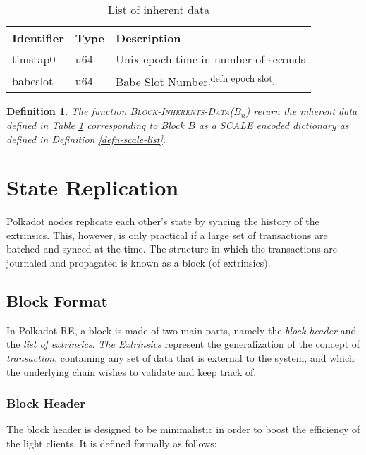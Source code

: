 \documentclass{book}
\newcommand{\tmem}[1]{{\em #1\/}}
\newcommand{\tmname}[1]{\textsc{#1}}
\newcommand{\tmrsup}[1]{\textsuperscript{#1}}
\newcommand{\tmtextit}[1]{{\itshape{#1}}}
\newcommand{\tmtextsc}[1]{{\scshape{#1}}}
\newtheorem{definition}{Definition}
\providecommand{\tmem}[1]{\tmtextit{#1}}
\providecommand{\tmname}[1]{\tmtextsc{#1}}
\providecommand{\tmtextit}[1]{\tmtextit{#1}}
\newtheorem{definition}{Definition}
\begin{document}
\begin{table}[h]
  \begin{tabular}{lll}
    \hline
    Identifier & Type  & Description\\
    \hline
    timstap0 & u64 & Unix epoch time in number of seconds\\
    babeslot & u64 & Babe Slot Number\tmrsup{\ref{defn-epoch-slot}}\\
    \hline
  \end{tabular}
  \caption{\label{tabl-inherent-data}List of inherent data}
\end{table}

\begin{definition}
  \label{defn-func-inherent-data}The function
  {\tmname{Block-Inherents-Data($B_n$)}} return the inherent data defined in
  Table \ref{tabl-inherent-data} corresponding to Block $B$ as a SCALE encoded
  dictionary as defined in Definition \ref{defn-scale-list}.
\end{definition}

\section{State Replication}\label{sect-state-replication}

Polkadot nodes replicate each other's state by syncing the history of the
extrinsics. This, however, is only practical if a large set of transactions
are batched and synced at the time. The structure in which the transactions
are journaled and propagated is known as a block (of extrinsics).

\subsection{Block Format}\label{sect-block-format}

In Polkadot RE, a block is made of two main parts, namely the \tmtextit{block
header} and the \tmtextit{list of extrinsics}. {\tmem{The Extrinsics}}
represent the generalization of the concept of {\tmem{transaction}},
containing any set of data that is external to the system, and which the
underlying chain wishes to validate and keep track of.

\subsubsection{Block Header}\label{block}

The block header is designed to be minimalistic in order to boost the
efficiency of the light clients. It is defined formally as follows:
\end{document}
